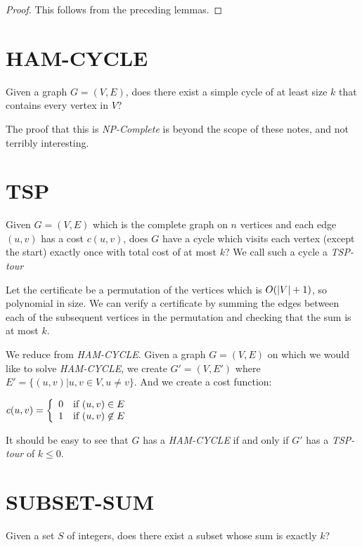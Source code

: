 \begin{proof}
  This follows from the preceding lemmas.
\end{proof}

\section{HAM-CYCLE}

Given a graph $G=(V,E)$, does there exist a simple cycle of at least
size $k$ that contains every vertex in $V$?

The proof that this is \emph{NP-Complete} is beyond the scope of these
notes, and not terribly interesting.

\section{TSP}

Given $G=(V,E)$ which is the complete graph on $n$ vertices and each
edge $(u,v)$ has a cost $c(u,v)$, does $G$ have a cycle which visits
each vertex (except the start) exactly once with total cost of at most
$k$?  We call such a cycle a \emph{TSP-tour}

Let the certificate be a permutation of the vertices which is
$O\!\left(|V| + 1\right)$, so polynomial in size.  We can verify a certificate
by summing the edges between each of the subsequent vertices in the
permutation and checking that the sum is at most $k$.

We reduce from \emph{HAM-CYCLE}.  Given a graph $G=(V,E)$ on which we
would like to solve \emph{HAM-CYCLE}, we create $G'=(V,E')$ where $E'
= \{ (u,v) | u,v \in V, u \neq v \}$.  And we create a cost function:

\begin{math}
  c(u,v) = \left\{ 
    \begin{array}{l l}
      0 & \text{if } (u,v) \in E \\
      1 & \text{if } (u,v) \not \in E \\
    \end{array} \right.
\end{math}

It should be easy to see that $G$ has a \emph{HAM-CYCLE} if and only
if $G'$ has a \emph{TSP-tour} of $k \leq 0$.

\section{SUBSET-SUM}

Given a set $S$ of integers, does there exist a subset whose sum is
exactly $k$?

